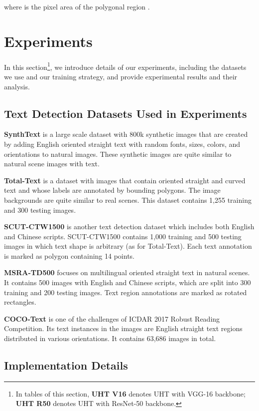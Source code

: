 \documentclass[10pt,twocolumn,letterpaper]{article}
\begin{document}
where  is the pixel area of the polygonal region . 




\section{Experiments}

In this section\footnote{In tables of this section, \textbf{UHT V16} denotes UHT with VGG-16 backbone; \textbf{UHT R50} denotes UHT with ResNet-50 backbone.}, we introduce details of our experiments, including the datasets we use and our training strategy, and provide experimental results and their analysis.

\subsection{Text Detection Datasets Used in Experiments}

\textbf{SynthText} \cite{synthtext} is a large scale dataset with 800k synthetic images that are created by adding English oriented straight text with random fonts, sizes, colors, and orientations to natural images. These synthetic images are quite similar to natural scene images with text.

\textbf{Total-Text} \cite{total-text} is a dataset with images that contain oriented straight and curved text and whose labels are annotated by bounding polygons. The image backgrounds are quite similar to real scenes. This dataset contains 1,255 training and 300 testing images.

\textbf{SCUT-CTW1500} \cite{scut-ctw1500} is another text detection dataset which includes both English and Chinese scripts. SCUT-CTW1500 contains 1,000 training and 500 testing images in which text shape is arbitrary (as for Total-Text). Each text annotation is marked as polygon containing 14 points.

\textbf{MSRA-TD500} \cite{msra-td500} focuses on multilingual oriented straight text in natural scenes. It contains 500 images with English and Chinese scripts, which are split into 300 training and 200 testing images. Text region annotations are marked as rotated rectangles.

\textbf{COCO-Text} \cite{cocotext} is one of the challenges of ICDAR 2017 Robust Reading Competition. Its text instances in the images are English straight text regions distributed in various orientations. It contains 63,686 images in total. 


\subsection{Implementation Details}
\end{document}
